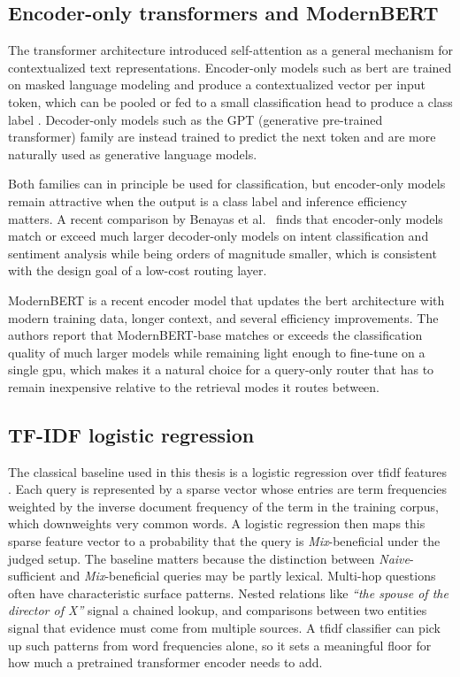 \documentclass[english, bibtex]{kththesis}               %
\numberwithin{listing}{chapter}
\begin{document}
\subsection{Encoder-only transformers and ModernBERT}
\label{sec:backgroundEncoders}

The transformer architecture \cite{vaswani2017attention} introduced self-attention as a general mechanism for contextualized text representations. Encoder-only models such as \gls{bert} are trained on masked language modeling and produce a contextualized vector per input token, which can be pooled or fed to a small classification head to produce a class label \cite{devlin2019bert}. Decoder-only models such as the GPT (generative pre-trained transformer) family are instead trained to predict the next token and are more naturally used as generative language models.

Both families can in principle be used for classification, but encoder-only models remain attractive when the output is a class label and inference efficiency matters. A recent comparison by Benayas et al.\ \cite{benayas2024encoder} finds that encoder-only models match or exceed much larger decoder-only models on intent classification and sentiment analysis while being orders of magnitude smaller, which is consistent with the design goal of a low-cost routing layer.

ModernBERT \cite{warner2024modernbert} is a recent encoder model that updates the \gls{bert} architecture with modern training data, longer context, and several efficiency improvements. The authors report that ModernBERT-base matches or exceeds the classification quality of much larger models while remaining light enough to fine-tune on a single \gls{gpu}, which makes it a natural choice for a query-only router that has to remain inexpensive relative to the retrieval modes it routes between.

\subsection{TF-IDF logistic regression}
\label{sec:backgroundTfidf}

The classical baseline used in this thesis is a logistic regression over \gls{tfidf} features \cite{salton1988termweighting}. Each query is represented by a sparse vector whose entries are term frequencies weighted by the inverse document frequency of the term in the training corpus, which downweights very common words. A logistic regression then maps this sparse feature vector to a probability that the query is \emph{Mix}-beneficial under the judged setup. The baseline matters because the distinction between \emph{Naive}-sufficient and \emph{Mix}-beneficial queries may be partly lexical. Multi-hop questions often have characteristic surface patterns. Nested relations like \emph{``the spouse of the director of X''} signal a chained lookup, and comparisons between two entities signal that evidence must come from multiple sources. A \gls{tfidf} classifier can pick up such patterns from word frequencies alone, so it sets a meaningful floor for how much a pretrained transformer encoder needs to add.
\end{document}
